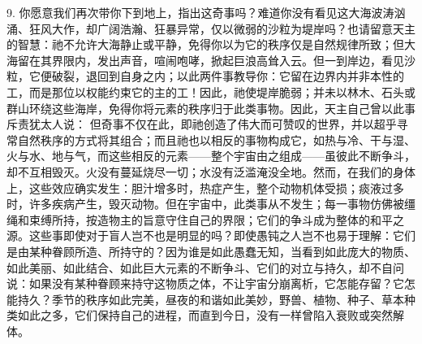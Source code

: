 9. 你愿意我们再次带你下到地上，指出这奇事吗？难道你没有看见这大海波涛汹涌、狂风大作，却广阔浩瀚、狂暴异常，仅以微弱的沙粒为堤岸吗？也请留意天主的智慧：祂不允许大海静止或平静，免得你以为它的秩序仅是自然规律所致；但大海留在其界限内，发出声音，喧闹咆哮，掀起巨浪高耸入云。但一到岸边，看见沙粒，它便破裂，退回到自身之内；以此两件事教导你：它留在边界内并非本性的工，而是那位以权能约束它的主的工！因此，祂使堤岸脆弱；并未以林木、石头或群山环绕这些海岸，免得你将元素的秩序归于此类事物。因此，天主自己曾以此事斥责犹太人说：  但奇事不仅在此，即祂创造了伟大而可赞叹的世界，并以超乎寻常自然秩序的方式将其组合；而且祂也以相反的事物构成它，如热与冷、干与湿、火与水、地与气，而这些相反的元素——整个宇宙由之组成——虽彼此不断争斗，却不互相毁灭。火没有蔓延烧尽一切；水没有泛滥淹没全地。然而，在我们的身体上，这些效应确实发生：胆汁增多时，热症产生，整个动物机体受损；痰液过多时，许多疾病产生，毁灭动物。但在宇宙中，此类事从不发生；每一事物仿佛被缰绳和束缚所持，按造物主的旨意守住自己的界限；它们的争斗成为整体的和平之源。这些事即使对于盲人岂不也是明显的吗？即使愚钝之人岂不也易于理解：它们是由某种眷顾所造、所持守的？因为谁是如此愚蠢无知，当看到如此庞大的物质、如此美丽、如此结合、如此巨大元素的不断争斗、它们的对立与持久，却不自问说：如果没有某种眷顾来持守这物质之体，不让宇宙分崩离析，它怎能存留？它怎能持久？季节的秩序如此完美，昼夜的和谐如此美妙，野兽、植物、种子、草本种类如此之多，它们保持自己的进程，而直到今日，没有一样曾陷入衰败或突然解体。\par

